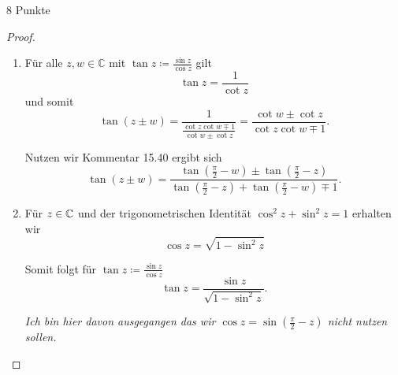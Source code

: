 \documentclass{../problemset}
\begin{document}
\begin{problem}{8 Punkte}
\begin{proof}
\begin{enumerate}
		\item Für alle $z, w \in \mathbb{C}$ mit $\tan z \coloneqq \frac{\sin z}{\cos z}$ gilt
		      \[
			      \tan z = \frac{1}{\cot z}
		      \] und somit
		      \[
			      \tan (z \pm w) = \frac{1}{\frac{\cot z \cot w \mp 1}{\cot w \pm \cot z }} = \frac{\cot w \pm \cot z }{\cot z \cot w \mp 1}.
		      \]

		      Nutzen wir Kommentar 15.40  ergibt sich
		      \[
			      \tan (z \pm w) = \frac{ \tan (\frac{\pi}{2} - w) \pm \tan (\frac{\pi}{2} - z)}{\tan (\frac{\pi}{2} - z) + \tan (\frac{\pi}{2} - w) \mp 1}.
		      \]

		\item Für $z \in \mathbb{C}$ und der trigonometrischen Identität $\cos^2 z + \sin^2 z = 1$ erhalten wir \[
			      \cos z = \sqrt{ 1 - \sin^2 z }
		      \]

		      Somit folgt für $\tan z \coloneqq \frac{\sin z}{\cos z}$ \[
			      \tan z = \frac{\sin z}{\sqrt{1 - \sin^2 z}}.
		      \]

		      \textit{Ich bin hier davon ausgegangen das wir $\cos z = \sin (\frac{\pi}{2} - z)$ nicht nutzen sollen.}
	\end{enumerate}

\end{proof}

\end{problem}
\end{document}
